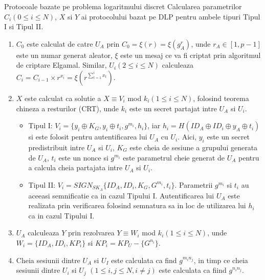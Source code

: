 \documentclass[11pt]{beamer}
\begin{document}
\begin{frame}[t,allowframebreaks]{Protocoale bazate pe problema logaritmului discret}
Calcularea parametrilor $C_i (0 \leq i \leq N)$, $X$ si $Y$ ai protocolului bazat pe DLP pentru ambele tipuri Tipul I si Tipul II.

\begin{enumerate}

\item $C_0$ este calculat de catre $U_A$ prin $C_0 = \xi(r) = \xi(g^r_A)$, unde $r_A \in [1, p-1]$ este un numar generat aleator, $\xi$ este un mesaj ce va fi criptat prin algoritmul de criptare Elgamal. Similar, $U_i (2 \leq i \leq N)$ calculeaza $C_i = C_{i-1} \times r^{x_i} = \xi(r^{\sum^i_{t=1}x_t})$.

\item $X$ este calculat ca solutie a $X \equiv V_i$ mod $k_i (1 \leq  i \leq N)$, folosind teorema chineza a resturilor (CRT), unde $k_i$ este un secret partajat intre $U_A$ si $U_i$.

\begin{itemize}

\item Tipul I: $V_i = \{y_i \oplus K_G, y_i \oplus t_i, g^{m_i}, h_i\}$, iar $h_i = H(ID_A \oplus ID_i \oplus y_A \oplus t_i)$ si este folosit pentru autentificarea lui $U_A$ cu $U_i$. Aici, $y_i$ este un secret predistribuit intre $U_A$ si $U_i$, $K_G$ este cheia de sesiune a grupului generata de $U_A$, $t_i$ este un nonce si $g^{m_i}$ este parametrul cheie generat de $U_A$ pentru a calcula cheia partajata intre $U_A$ si $U_i$.
\item Tipul II: $V_i = SIGN_{SK_A}\{ID_A, ID_i, K_G, G^{m_i}, t_i\}$. Parametrii $g^{m_i}$ si $t_i$ au aceeasi semnificatie ca in cazul Tipului I. Autentificarea lui $U_A$ este realizata prin verificarea folosind semnatura sa in loc de utilizarea lui $h_i$ ca in cazul Tipului I.

\end{itemize}

\item $U_A$ calculeaza $Y$ prin rezolvarea $Y \equiv W_i$ mod $k_i (1 \leq i \leq N)$, unde $W_i = \{ID_A, ID_i, KP_i\}$ si $KP_i = KP_U - \{G^{n_i}\}$.

\item Cheia sesiunii dintre $U_A$ si $U_I$ este calculata ca find  $g^{m_in_j}$, in timp ce cheia sesiunii dintre $U_i$ si $U_j$ $(1 \leq i, j \leq N, i \neq j)$ este calculata ca fiind $g^{n_in_j}$.

\end{enumerate}

\end{frame}
\end{document}
